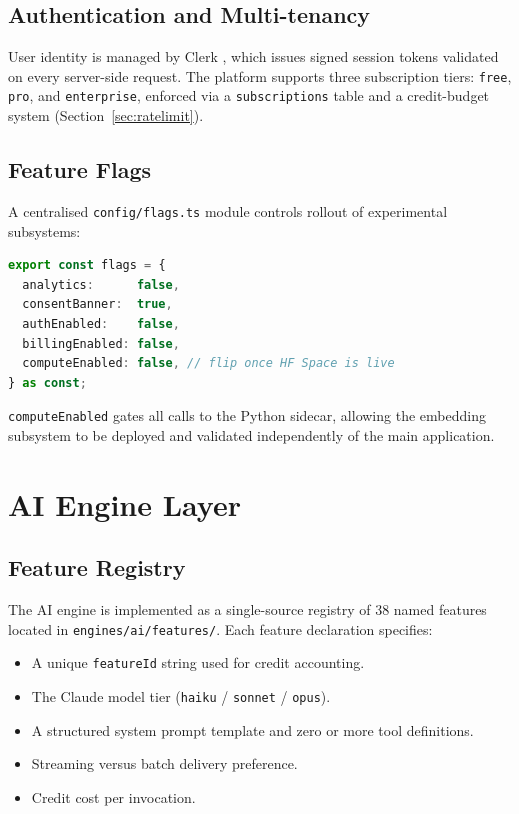 \documentclass[conference]{IEEEtran}
\begin{document}
\subsection{Authentication and Multi-tenancy}

User identity is managed by Clerk \cite{clerk2024}, which issues signed
session tokens validated on every server-side request. The platform supports
three subscription tiers: \texttt{free}, \texttt{pro}, and \texttt{enterprise},
enforced via a \texttt{subscriptions} table and a credit-budget system
(Section~\ref{sec:ratelimit}).

\subsection{Feature Flags}

A centralised \texttt{config/flags.ts} module controls rollout of experimental
subsystems:

\begin{lstlisting}[language=TypeScript, caption={Feature flags module.}]
export const flags = {
  analytics:      false,
  consentBanner:  true,
  authEnabled:    false,
  billingEnabled: false,
  computeEnabled: false, // flip once HF Space is live
} as const;
\end{lstlisting}

\texttt{computeEnabled} gates all calls to the Python sidecar, allowing the
embedding subsystem to be deployed and validated independently of the main
application.

\section{AI Engine Layer}
\label{sec:ai}

\subsection{Feature Registry}

The AI engine is implemented as a single-source registry of 38 named features
located in \texttt{engines/ai/features/}. Each feature declaration specifies:

\begin{itemize}
  \item A unique \texttt{featureId} string used for credit accounting.
  \item The Claude model tier (\texttt{haiku} / \texttt{sonnet} / \texttt{opus}).
  \item A structured system prompt template and zero or more tool definitions.
  \item Streaming versus batch delivery preference.
  \item Credit cost per invocation.
\end{itemize}
\end{document}
